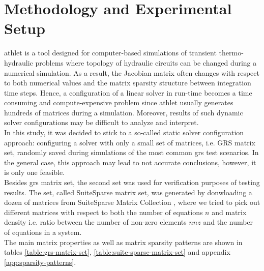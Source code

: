 \chapter{Methodology and Experimental Setup}\label{subseq:matrix-sets-and-hardware}

\acrshort{athlet} is a tool designed for computer-based simulations of transient thermo-hydraulic problems where topology of hydraulic circuits can be changed during a numerical simulation. As a result, the Jacobian matrix often changes with respect to both numerical values and the matrix sparsity structure between integration time steps. Hence, a configuration of a linear solver in run-time becomes a time consuming and compute-expensive problem since \acrshort{athlet} usually generates hundreds of matrices during a simulation. Moreover, results of such dynamic solver configurations may be difficult to analyze and interpret.\\


In this study, it was decided to stick to a so-called static solver configuration approach: configuring a solver with only a small set of matrices, i.e. GRS matrix set, randomly saved during simulations of the most common \acrshort{grs} test scenarios. In the general case, this approach may lead to not accurate conclusions, however, it is only one feasible.\\


Besides \acrshort{grs} matrix set, the second set was  used for verification purposes of testing results. The set, called SuiteSparse matrix set, was generated by donwloading a dozen of matrices from SuiteSparse Matrix Collection \cite{sparse-matrix-collection:1}, \cite{sparse-matrix-collection:2} where we tried to pick out different matrices with respect to both the number of equations $n$ and matrix density i.e. ratio between the number of non-zero elements $nnz$ and the number of equations in a system.\\ 


The main matrix properties as well as matrix sparsity patterns are shown in tables \ref{table:grs-matrix-set}, \ref{table:suite-sparse-matrix-set} and appendix \ref{app:sparsity-patterns}.\\


